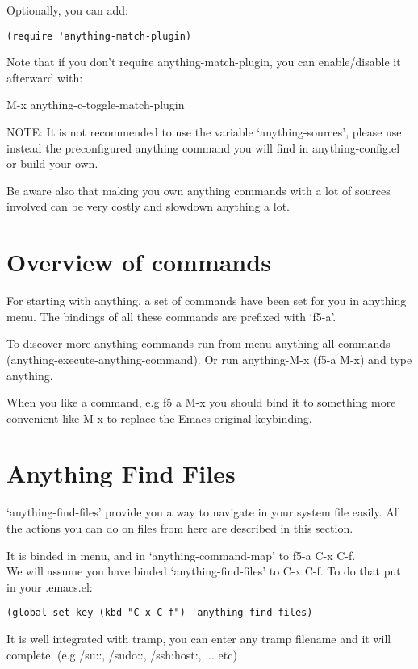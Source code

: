 \documentclass[a4paper,11pt]{article}
\begin{document}
Optionally, you can add:

\begin{verbatim}
(require 'anything-match-plugin)
\end{verbatim}

Note that if you don't require anything-match-plugin, you can enable/disable it afterward with:

M-x anything-c-toggle-match-plugin

NOTE:
It is not recommended to use the variable `anything-sources', please use instead the preconfigured anything command
you will find in anything-config.el or build your own.

Be aware also that making you own anything commands with a lot of sources involved can be very costly and slowdown
anything a lot.
  
\section{Overview of commands}
\label{sec:overv-comm-avail}
For starting with anything, a set of commands have been set for you in anything menu.
The bindings of all these commands are prefixed with `f5-a'.

To discover more anything commands run from menu anything all commands (anything-execute-anything-command).
Or run anything-M-x (f5-a M-x) and type anything.

When you like a command, e.g f5 a M-x you should bind it to something more convenient like M-x to replace the Emacs
original keybinding.

\section{Anything Find Files}
\label{sec:anything-find-files}
`anything-find-files' provide you a way to navigate in your system file easily.
All the actions you can do on files from here are described in this section.

It is binded in menu, and in `anything-command-map' to f5-a C-x C-f. \\
We will assume you have binded `anything-find-files' to C-x C-f.
To do that put in your .emacs.el:
\begin{verbatim}
(global-set-key (kbd "C-x C-f") 'anything-find-files)
\end{verbatim}
It is well integrated with tramp, you can enter any tramp filename and it will complete.
(e.g /su::, /sudo::, /ssh:host:, ... etc)
\end{document}
